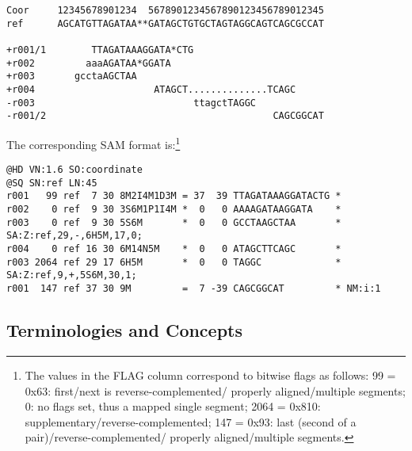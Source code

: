 \documentclass[10pt]{article}
\begin{document}
\begin{framed}\small
\begin{verbatim}
Coor     12345678901234  5678901234567890123456789012345
ref      AGCATGTTAGATAA**GATAGCTGTGCTAGTAGGCAGTCAGCGCCAT

+r001/1        TTAGATAAAGGATA*CTG
+r002         aaaAGATAA*GGATA
+r003       gcctaAGCTAA
+r004                     ATAGCT..............TCAGC
-r003                            ttagctTAGGC
-r001/2                                        CAGCGGCAT
\end{verbatim}
\end{framed}
The corresponding SAM format is:\footnote{The values in the
{\sf FLAG} column correspond to bitwise flags as follows:
99 = 0x63: first\slash next is reverse-complemented\slash
properly aligned\slash multiple segments;
0: no flags set, thus a mapped single segment;
2064 = 0x810: supplementary\slash reverse-complemented;
147 = 0x93: last (second of a pair)\slash reverse-complemented\slash
properly aligned\slash multiple segments.}
\begin{framed}\small
\begin{verbatim}
@HD VN:1.6 SO:coordinate
@SQ SN:ref LN:45
r001   99 ref  7 30 8M2I4M1D3M = 37  39 TTAGATAAAGGATACTG *
r002    0 ref  9 30 3S6M1P1I4M *  0   0 AAAAGATAAGGATA    *
r003    0 ref  9 30 5S6M       *  0   0 GCCTAAGCTAA       * SA:Z:ref,29,-,6H5M,17,0;
r004    0 ref 16 30 6M14N5M    *  0   0 ATAGCTTCAGC       *
r003 2064 ref 29 17 6H5M       *  0   0 TAGGC             * SA:Z:ref,9,+,5S6M,30,1;
r001  147 ref 37 30 9M         =  7 -39 CAGCGGCAT         * NM:i:1
\end{verbatim}
\end{framed}

\subsection{Terminologies and Concepts}
\end{document}
